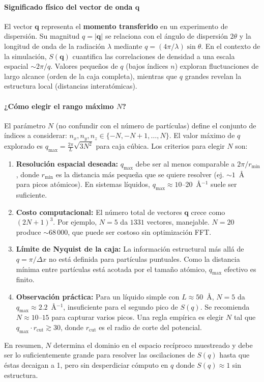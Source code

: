 \documentclass{tufte-handout}
\begin{document}
\paragraph*{Significado físico del vector de onda $\mathbf{q}$}

El vector $\mathbf{q}$ representa el \textbf{momento transferido} en un experimento de dispersión. Su magnitud $q = |\mathbf{q}|$ se relaciona con el ángulo de dispersión $2\theta$ y la longitud de onda de la radiación $\lambda$ mediante $q = (4\pi/\lambda)\sin\theta$. En el contexto de la simulación, $S(\mathbf{q})$ cuantifica las correlaciones de densidad a una escala espacial $\sim 2\pi/q$. Valores pequeños de $q$ (bajos índices $n$) exploran fluctuaciones de largo alcance (orden de la caja completa), mientras que $q$ grandes revelan la estructura local (distancias interatómicas).

\paragraph*{¿Cómo elegir el rango máximo $N$?}

El parámetro $N$ (no confundir con el número de partículas) define el conjunto de índices a considerar: $n_x, n_y, n_z \in \{-N, -N+1, \dots, N\}$. El valor máximo de $q$ explorado es $q_{\text{max}} = \frac{2\pi}{L} \sqrt{3N^2}$ para caja cúbica. Los criterios para elegir $N$ son:

\begin{enumerate}
    \item \textbf{Resolución espacial deseada:} $q_{\text{max}}$ debe ser al menos comparable a $2\pi / r_{\text{min}}$, donde $r_{\text{min}}$ es la distancia más pequeña que se quiere resolver (ej. $\sim 1$~Å para picos atómicos). En sistemas líquidos, $q_{\text{max}} \approx 10\text{--}20$~Å$^{-1}$ suele ser suficiente.
    
    \item \textbf{Costo computacional:} El número total de vectores $\mathbf{q}$ crece como $(2N+1)^3$. Por ejemplo, $N=5$ da $1331$ vectores, manejable. $N=20$ produce $\sim 68\,000$, que puede ser costoso sin optimización FFT.
    
    \item \textbf{Límite de Nyquist de la caja:} La información estructural más allá de $q = \pi / \Delta x$ no está definida para partículas puntuales. Como la distancia mínima entre partículas está acotada por el tamaño atómico, $q_{\text{max}}$ efectivo es finito.
    
    \item \textbf{Observación práctica:} Para un líquido simple con $L \approx 50$~Å, $N=5$ da $q_{\text{max}} \approx 2.2$~Å$^{-1}$, insuficiente para el segundo pico de $S(q)$. Se recomienda $N \approx 10\text{--}15$ para capturar varios picos. Una regla empírica es elegir $N$ tal que $q_{\text{max}} \cdot r_{\text{cut}} \gtrsim 30$, donde $r_{\text{cut}}$ es el radio de corte del potencial.
\end{enumerate}

En resumen, $N$ determina el dominio en el espacio recíproco muestreado y debe ser lo suficientemente grande para resolver las oscilaciones de $S(q)$ hasta que éstas decaigan a 1, pero sin desperdiciar cómputo en $q$ donde $S(q)\approx 1$ sin estructura.
\end{document}
